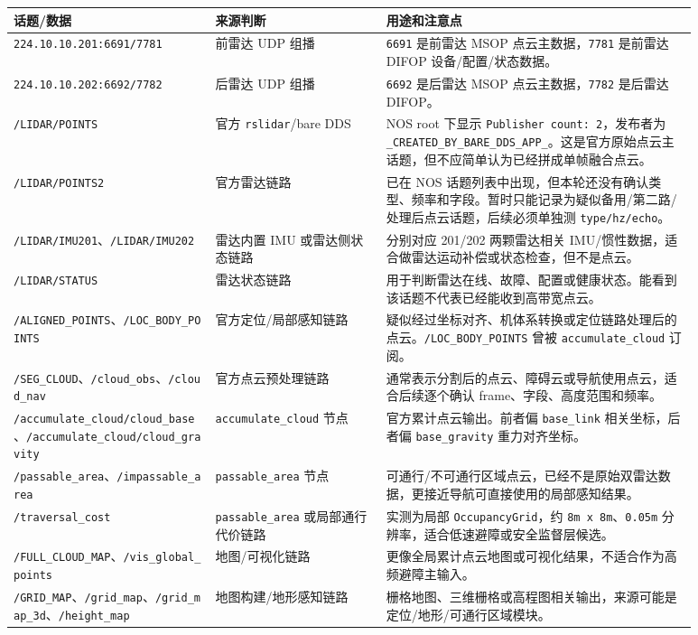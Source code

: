 \documentclass[UTF8,11pt,a4paper]{ctexart}
\begin{document}
\begin{center}
\renewcommand{\arraystretch}{1.18}
\begin{tabular}{p{0.26\linewidth}p{0.22\linewidth}p{0.40\linewidth}}
\toprule
\textbf{话题/数据} & \textbf{来源判断} & \textbf{用途和注意点}\\
\midrule
\texttt{224.10.10.201:6691/7781} &
前雷达 UDP 组播 &
\texttt{6691} 是前雷达 MSOP 点云主数据，\texttt{7781} 是前雷达 DIFOP 设备/配置/状态数据。\\
\texttt{224.10.10.202:6692/7782} &
后雷达 UDP 组播 &
\texttt{6692} 是后雷达 MSOP 点云主数据，\texttt{7782} 是后雷达 DIFOP。\\
\texttt{/LIDAR/POINTS} &
官方 \texttt{rslidar}/bare DDS &
NOS root 下显示 \texttt{Publisher count: 2}，发布者为 \texttt{\_CREATED\_BY\_BARE\_DDS\_APP\_}。这是官方原始点云主话题，但不应简单认为已经拼成单帧融合点云。\\
\texttt{/LIDAR/POINTS2} &
官方雷达链路 &
已在 NOS 话题列表中出现，但本轮还没有确认类型、频率和字段。暂时只能记录为疑似备用/第二路/处理后点云话题，后续必须单独测 \texttt{type/hz/echo}。\\
\texttt{/LIDAR/IMU201}、\texttt{/LIDAR/IMU202} &
雷达内置 IMU 或雷达侧状态链路 &
分别对应 201/202 两颗雷达相关 IMU/惯性数据，适合做雷达运动补偿或状态检查，但不是点云。\\
\texttt{/LIDAR/STATUS} &
雷达状态链路 &
用于判断雷达在线、故障、配置或健康状态。能看到该话题不代表已经能收到高带宽点云。\\
\texttt{/ALIGNED\_POINTS}、\texttt{/LOC\_BODY\_POINTS} &
官方定位/局部感知链路 &
疑似经过坐标对齐、机体系转换或定位链路处理后的点云。\texttt{/LOC\_BODY\_POINTS} 曾被 \texttt{accumulate\_cloud} 订阅。\\
\texttt{/SEG\_CLOUD}、\texttt{/cloud\_obs}、\texttt{/cloud\_nav} &
官方点云预处理链路 &
通常表示分割后的点云、障碍云或导航使用点云，适合后续逐个确认 frame、字段、高度范围和频率。\\
\texttt{/accumulate\_cloud/cloud\_base}、\texttt{/accumulate\_cloud/cloud\_gravity} &
\texttt{accumulate\_cloud} 节点 &
官方累计点云输出。前者偏 \texttt{base\_link} 相关坐标，后者偏 \texttt{base\_gravity} 重力对齐坐标。\\
\texttt{/passable\_area}、\texttt{/impassable\_area} &
\texttt{passable\_area} 节点 &
可通行/不可通行区域点云，已经不是原始双雷达数据，更接近导航可直接使用的局部感知结果。\\
\texttt{/traversal\_cost} &
\texttt{passable\_area} 或局部通行代价链路 &
实测为局部 \texttt{OccupancyGrid}，约 \texttt{8m x 8m}、\texttt{0.05m} 分辨率，适合低速避障或安全监督层候选。\\
\texttt{/FULL\_CLOUD\_MAP}、\texttt{/vis\_global\_points} &
地图/可视化链路 &
更像全局累计点云地图或可视化结果，不适合作为高频避障主输入。\\
\texttt{/GRID\_MAP}、\texttt{/grid\_map}、\texttt{/grid\_map\_3d}、\texttt{/height\_map} &
地图构建/地形感知链路 &
栅格地图、三维栅格或高程图相关输出，来源可能是定位/地形/可通行区域模块。\\
\bottomrule
\end{tabular}
\end{center}
\end{document}
